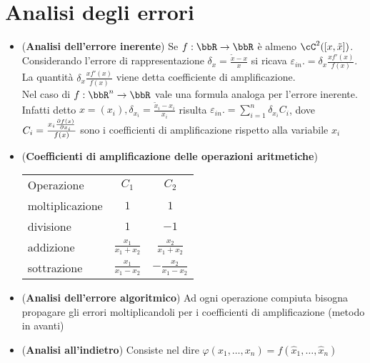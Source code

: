 \documentclass[a4paper,NoNotes,GeneralMath]{stdmdoc}
\begin{document}
	\section{Analisi degli errori}
	\begin{itemize}
		\item ({\bf Analisi dell'errore inerente}) Se $f: \bbR \rar \bbR$ è almeno $\cC^2 ([x, \tilde x])$. Considerando l'errore di rappresentazione $\delta_x = \frac{\tilde x - x}{x}$ si ricava $\varepsilon_{in} .= \delta_x \frac{x f'(x)}{f(x)}$. La quantità $ \delta_x \frac{x f'(x)}{f(x)}$ viene detta coefficiente di amplificazione. \\ Nel caso di $f: \bbR^n \rar \bbR$ vale una formula analoga per l'errore inerente. Infatti detto $x = (x_i), \delta_{x_i} = \frac{\tilde x_i - x_i}{x_i}$ risulta $\varepsilon_{in} .= \sum_{i=1}^{n} \delta_{x_i} C_i$, dove $C_i = \frac{x_i \dpar{f(x)}{x_i}}{f(x)}$ sono i coefficienti di amplificazione rispetto alla variabile $x_i$
		\item ({\bf Coefficienti di amplificazione delle operazioni aritmetiche}) \newline
			\begin{tabular}{l|cc}
			Operazione & $C_1$ & $C_2$ \\ 
			moltiplicazione & $1$ & $1$ \\
			divisione & $1$ & $-1$ \\
			addizione & $\frac{x_1}{x_1 + x_2}$ & $\frac{x_2}{x_1 + x_2}$ \\
			sottrazione & $\frac{x_1}{x_1 - x_2}$ & $-\frac{x_2}{x_1 - x_2}$ \\
			\end{tabular} \vskip 1.0cm
		\item ({\bf Analisi dell'errore algoritmico}) Ad ogni operazione compiuta bisogna propagare gli errori moltiplicandoli per i coefficienti di amplificazione (metodo in avanti)
		\item ({\bf Analisi all'indietro}) Consiste nel dire $\varphi(x_1, \ldots, x_n) = f(\hat x_1, \ldots, \hat x_n)$
	\end{itemize}
\end{document}
